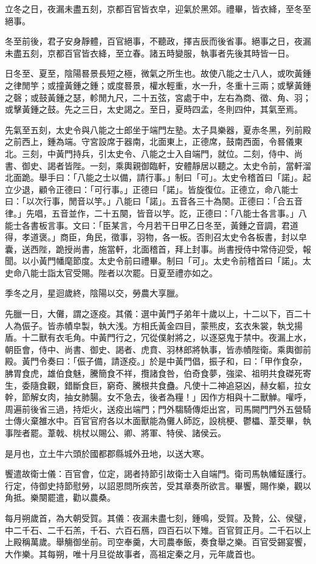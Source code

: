 \begin{pinyinscope}
立冬之日，夜漏未盡五刻，京都百官皆衣皁，迎氣於黑郊。禮畢，皆衣絳，至冬至絕事。

冬至前後，君子安身靜體，百官絕事，不聽政，擇吉辰而後省事。絕事之日，夜漏未盡五刻，京都百官皆衣絳，至立春。諸五時變服，執事者先後其時皆一日。

日冬至、夏至，陰陽晷景長短之極，微氣之所生也。故使八能之士八人，或吹黃鍾之律閒竽；或撞黃鍾之鍾；或度晷景，權水輕重，水一升，冬重十三兩；或擊黃鍾之磬；或鼓黃鍾之瑟，軫閒九尺，二十五弦，宮處于中，左右為商、徵、角、羽；或擊黃鍾之鼓。先之三日，太史謁之。至日，夏時四孟，冬則四仲，其氣至焉。

先氣至五刻，太史令與八能之士郎坐于端門左塾。太子具樂器，夏赤冬黑，列前殿之前西上，鍾為端。守宮設席于器南，北面東上，正德席，鼓南西面，令晷儀東北。三刻，中黃門持兵，引太史令、八能之士入自端門，就位。二刻，侍中、尚書、御史、謁者皆陛。一刻，乘輿親御臨軒，安體靜居以聽之。太史令前，當軒溜北面跪。舉手曰：「八能之士以備，請行事。」制曰「可」。太史令稽首曰「諾」。起立少退，顧令正德曰：「可行事。」正德曰「諾」。皆旋復位。正德立，命八能士曰：「以次行事，閒音以竽。」八能曰「諾」。五音各三十為闋。正德曰：「合五音律。」先唱，五音並作，二十五闋，皆音以竽。訖，正德曰：「八能士各言事。」八能士各書板言事。文曰：「臣某言，今月若干日甲乙日冬至，黃鍾之音調，君道得，孝道褒。」商臣，角民，徵事，羽物，各一板。否則召太史令各板書，封以皁囊，送西陛，跪授尚書，施當軒，北面稽首，拜上封事。尚書授侍中常侍迎受，報聞。以小黃門幡麾節度。太史令前曰禮畢。制曰「可」。太史令前稽首曰「諾」。太史命八能士詣太官受賜。陛者以次罷。日夏至禮亦如之。

季冬之月，星迴歲終，陰陽以交，勞農大享臘。

先臘一日，大儺，謂之逐疫。其儀：選中黃門子弟年十歲以上，十二以下，百二十人為侲子。皆赤幘皁製，執大浅。方相氏黃金四目，蒙熊皮，玄衣朱裳，執戈揚盾。十二獸有衣毛角。中黃門行之，冗從僕射將之，以逐惡鬼于禁中。夜漏上水，朝臣會，侍中、尚書、御史、謁者、虎賁、羽林郎將執事，皆赤幘陛衛。乘輿御前殿。黃門令奏曰：「侲子備，請逐疫。」於是中黃門倡，振子和，曰：「甲作食杂，胇胃食虎，雄伯食魅，騰簡食不祥，攬諸食咎，伯奇食夢，強梁、祖明共食磔死寄生，委隨食觀，錯斷食巨，窮奇、騰根共食蠱。凡使十二神追惡凶，赫女軀，拉女幹，節解女肉，抽女肺腸。女不急去，後者為糧！」因作方相與十二獸觯。嚾呼，周遍前後省三過，持炬火，送疫出端門；門外騶騎傳炬出宮，司馬闕門門外五營騎士傳火棄雒水中。百官官府各以木面獸能為儺人師訖，設桃梗、鬱櫑、葦茭畢，執事陛者罷。葦戟、桃杖以賜公、卿、將軍、特侯、諸侯云。

是月也，立土牛六頭於國都郡縣城外丑地，以送大寒。

饗遣故衛士儀：百官會，位定，謁者持節引故衛士入自端門。衛司馬執幡鉦護行。行定，侍御史持節慰勞，以詔恩問所疾苦，受其章奏所欲言。畢饗，賜作樂，觀以角抵。樂闋罷遣，勸以農桑。

每月朔歲首，為大朝受賀。其儀：夜漏未盡七刻，鍾鳴，受賀。及贄，公、侯璧，中二千石、二千石羔，千石、六百石鴈，四百石以下雉。百官賀正月。二千石以上上殿稱萬歲。舉觴御坐前。司空奉羹，大司農奉飯，奏食舉之樂。百官受錫宴饗，大作樂。其每朔，唯十月旦從故事者，高祖定秦之月，元年歲首也。


\end{pinyinscope}